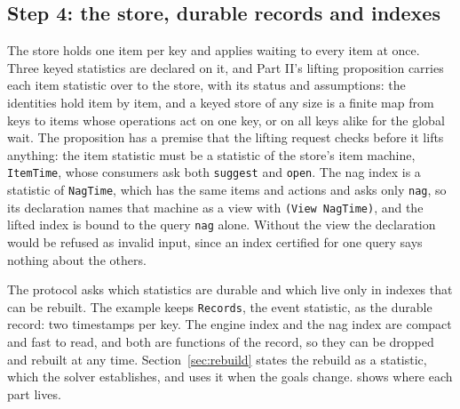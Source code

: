\documentclass[11pt]{article}
\newcommand{\code}[1]{\texttt{#1}}
\theoremstyle{definition}
\theoremstyle{plain}
\begin{document}
\subsection{Step 4: the store, durable records and indexes}\label{sec:store}

The store holds one item per key and applies waiting to every item at once. Three keyed statistics
are declared on it, and Part II's lifting proposition \cite[Proposition~4.3]{part2} carries each
item statistic over to the store, with its status and assumptions: the identities hold item by item,
and a keyed store of any size is a finite map from keys to items whose operations act on one key, or
on all keys alike for the global wait. The proposition has a premise that the lifting request checks
before it lifts anything: the item statistic must be a statistic of the store's item machine,
\code{ItemTime}, whose consumers ask both \code{suggest} and \code{open}. The nag index is a
statistic of \code{NagTime}, which has the same items and actions and asks only \code{nag}, so its
declaration names that machine as a view with \code{(View NagTime)}, and the lifted index is bound to
the query \code{nag} alone. Without the view the declaration would be refused as invalid input, since
an index certified for one query says nothing about the others.

The protocol asks which statistics are durable and which live only in indexes that can be rebuilt.
The example keeps \code{Records}, the event statistic, as the durable record: two timestamps per
key. The engine index and the nag index are compact and fast to read, and both are functions of the
record, so they can be dropped and rebuilt at any time. Section~\ref{sec:rebuild} states the rebuild
as a statistic, which the solver establishes, and uses it when the goals change.  shows where each part
lives.
\end{document}
